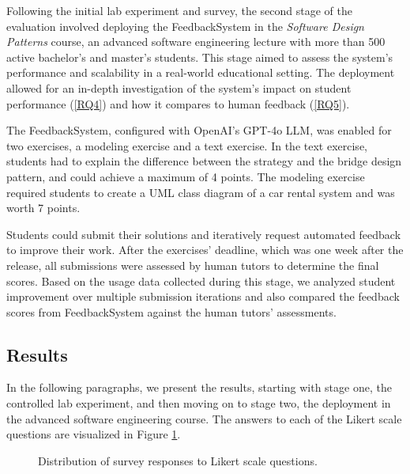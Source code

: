 \documentclass[sigconf,screen,review,anonymous]{acmart}
\begin{document}
Following the initial lab experiment and survey, the second stage of the evaluation involved deploying the FeedbackSystem in the \textit{Software Design Patterns} course, an advanced software engineering lecture with more than 500 active bachelor's and master's students.
This stage aimed to assess the system's performance and scalability in a real-world educational setting.
The deployment allowed for an in-depth investigation of the system's impact on student performance (\ref{RQ4}) and how it compares to human feedback (\ref{RQ5}).

The FeedbackSystem, configured with OpenAI's GPT-4o LLM, was enabled for two exercises, a modeling exercise and a text exercise.
In the text exercise, students had to explain the difference between the strategy and the bridge design pattern, and could achieve a maximum of 4 points.
The modeling exercise required students to create a UML class diagram of a car rental system and was worth 7 points. 

Students could submit their solutions and iteratively request automated feedback to improve their work.
After the exercises' deadline, which was one week after the release, all submissions were assessed by human tutors to determine the final scores.
Based on the usage data collected during this stage, we analyzed student improvement over multiple submission iterations and also compared the feedback scores from FeedbackSystem against the human tutors' assessments. 


\subsection{Results}

In the following paragraphs, we present the results, starting with stage one, the controlled lab experiment, and then moving on to stage two, the deployment in the advanced software engineering course.
The answers to each of the Likert scale questions are visualized in Figure \ref{fig:Survey-Results}.

\begin{figure}[htpb]
  \centering
  \resizebox{\linewidth}{!}{
    
  }
  \caption{Distribution of survey responses to Likert scale questions.}
  \label{fig:Survey-Results}
\end{figure}


\end{document}
